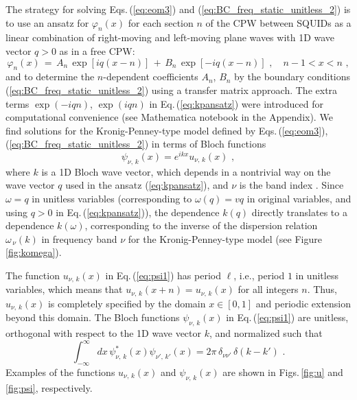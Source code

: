 The strategy for solving Eqs.\,(\ref{eq:eom3}) and (\ref{eq:BC_freq_static_unitless_2}) 
is to use an ansatz for $\varphi_n(x)$ for each section $n$ of the CPW
between SQUIDs as a linear combination of right-moving
and left-moving plane waves with 1D wave vector $q>0$ as in a free CPW:
%
\begin{equation} \label{eq:kpansatz}
\varphi_n(x) \, = \, A_n \, \exp\left[i q (x-n) \right] \, + \, 
B_n \, \exp\left[-i q (x-n) \right] \, \, , \quad n-1 < x < n \, \, ,
\end{equation}
%
and to determine the $n$-dependent coefficients $A_n$, $B_n$ by the boundary conditions 
(\ref{eq:BC_freq_static_unitless_2}) using a transfer matrix approach.
The extra terms $\exp(- i q n)$, $\exp(i q n)$ in Eq.\,(\ref{eq:kpansatz}) were introduced 
for computational convenience (see Mathematica notebook in the Appendix).
%
We find solutions for the Kronig-Penney-type model defined by 
Eqs.\,(\ref{eq:eom3}), (\ref{eq:BC_freq_static_unitless_2})
in terms of Bloch functions
%
\begin{equation} \label{eq:psi1}
\psi_{\nu,\,k}(x) = e^{i k x} u_{\nu,\,k}(x) \, \, ,   
\end{equation}
%
where $k$ is a 1D Bloch wave vector, which depends in a nontrivial way on the wave vector $q$ used in the ansatz (\ref{eq:kpansatz}), and $\nu$ is the band index \cite{Ashcroft1976}.
Since $\omega = q$ in unitless variables (corresponding to $\omega(q) = v q$ in original variables,
and using $q>0$ in Eq.\,(\ref{eq:kpansatz})),
the dependence $k(q)$ directly translates to a dependence $k(\omega)$, corresponding to the 
inverse of the dispersion relation $\omega_{\,\nu}(k)$ in frequency band $\nu$ for the Kronig-Penney-type model (see Figure \ref{fig:komega}).

The function  $u_{\nu,\,k}(x)$ in Eq.\,(\ref{eq:psi1}) has period $\ell$, i.e., 
period $1$ in unitless variables, which means that
$u_{\nu,\,k}(x + n) = u_{\nu,\,k}(x)$ for all integers $n$. 
Thus, $u_{\nu,\,k}(x)$ is completely specified by the domain $x \in [0,1]$ 
and periodic extension beyond this domain.
The Bloch functions $\psi_{\nu,\,k}(x)$ in Eq.\,(\ref{eq:psi1})
are unitless, orthogonal with respect to the 1D wave vector $k$, and normalized such that
%
\begin{equation} \label{eq:psi1_norm_orig}
\int_{-\infty}^{\infty} dx \, \psi^*_{\nu,\,k}(x) \psi_{\nu',\,k'}(x) = 2 \pi \, \delta_{\nu \nu'} \, \delta(k - k') \, \, .
\end{equation}
%
Examples of the functions $u_{\nu,\,k}(x)$ and $\psi_{\nu,\,k}(x)$
are shown in Figs.\,\ref{fig:u} and \ref{fig:psi}, respectively. 

